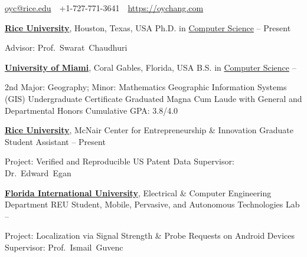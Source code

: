 \documentclass[letterpaper,MMMyyyy,nonstopmode]{simpleresumecv}
\newcommand{\CVAuthor}{Oliver Chang}
\newcommand{\CVWebpage}{https://oychang.com}
\begin{document}

\Title{\CVAuthor}

\begin{SubTitle}
\href{mailto:oyc@rice.edu}{oyc@rice.edu}
\,\SubBulletSymbol\,
+1-727-771-3641
\,\SubBulletSymbol\,
\href{\CVWebpage}
{\url{\CVWebpage}}
\end{SubTitle}

\begin{Body}



\Entry
\href{http://www.rice.edu/}{\textbf{Rice University}},
Houston, Texas, USA
\Gap
\BulletItem
Ph.D. in \href{http://www.cs.rice.edu/}{Computer Science}
\hfill
{} -- Present
\begin{Detail}
\SubBulletItem Advisor: Prof.~Swarat~Chaudhuri
\end{Detail}

\BigGap

\Entry
\href{http://welcome.miami.edu/}{\textbf{University of Miami}},
Coral Gables, Florida, USA
\Gap
\BulletItem
B.S. in \href{http://www.as.miami.edu/csc/}{Computer Science}
\hfill
{} -- 
\begin{Detail}
\SubBulletItem 2nd Major: Geography; Minor: Mathematics
\SubBulletItem Geographic Information Systems (GIS) Undergraduate Certificate
\SubBulletItem Graduated Magna Cum Laude with General and Departmental Honors
\SubBulletItem Cumulative GPA: 3.8/4.0
\end{Detail}



\Entry
\href{http://www.rice.edu/}{\textbf{Rice University}}, McNair Center for Entrepreneurship \& Innovation
\Gap
\BulletItem Graduate Student Assistant
\hfill {} -- Present
\begin{Detail}
\SubBulletItem
Project: Verified and Reproducible US Patent Data
\SubBulletItem
Supervisor: Dr.~Edward~Egan
\end{Detail}

\Entry
\href{http://www.fiu.edu/}{\textbf{Florida International University}}, Electrical \& Computer Engineering Department
\Gap
\BulletItem REU Student, Mobile, Pervasive, and Autonomous Technologies Lab
\hfill {} -- 
\begin{Detail}
\SubBulletItem
Project: Localization via Signal Strength \& Probe Requests on Android Devices
\SubBulletItem
Supervisor: Prof.~Ismail~Guvenc
\end{Detail}


\end{Body}
\end{document}
